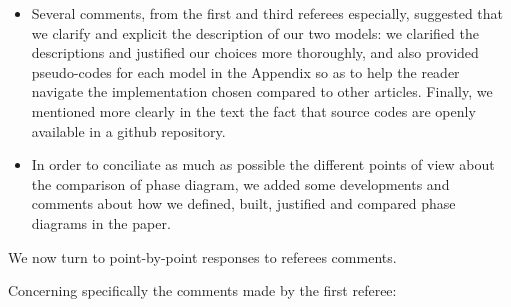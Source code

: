 \documentclass[11pt,a4paper,sans]{moderncv}        %
\begin{document}
\begin{itemize}
	\item Several comments, from the first and third referees especially, suggested that we clarify and explicit the description of our two models: we clarified the descriptions and justified our choices more thoroughly, and also provided pseudo-codes for each model in the Appendix so as to help the reader navigate the implementation chosen compared to other articles. Finally, we mentioned more clearly in the text the fact that source codes are openly available in a github repository.
    \item In order to conciliate as much as possible the different points of view about the comparison of phase diagram, we added some developments and comments about how we defined, built, justified and compared phase diagrams in the paper.
    \end{itemize}

\medskip



We now turn to point-by-point responses to referees comments.


\medskip


Concerning specifically the comments made by the first referee:
\end{document}
